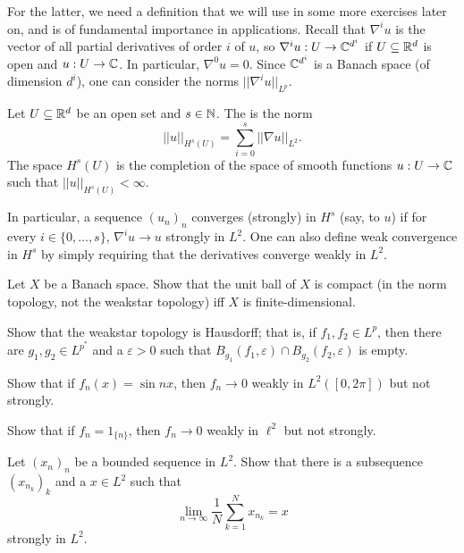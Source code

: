 For the latter, we need a definition that we will use in some more exercises later on, and is of fundamental importance in applications.
Recall that $\nabla^iu$ is the vector of all partial derivatives of order $i$ of $u$, so $\nabla^iu: U \to \mathbb{C}^{d^i}$ if $U \subseteq \mathbb{R}^d$ is open and $u: U \to \mathbb{C}$.
In particular, $\nabla^0u = 0$.
Since $\mathbb{C}^{d^i}$ is a Banach space (of dimension $d^i$), one can consider the norms $||\nabla^iu||_{L^p}$.

\begin{definition}
Let $U \subseteq \mathbb{R}^d$ be an open set and $s \in \mathbb{N}$.
The  is the norm
\[||u||_{H^s(U)} = \sum_{i=0}^{s} ||\nabla u||_{L^2}.\]
The space $H^s(U)$ is the completion of the space of smooth functions $u: U \to \mathbb{C}$ such that $||u||_{H^s(U)} < \infty$.
\end{definition}
In particular, a sequence $(u_{n})_{n}$ converges (strongly) in $H^s$ (say, to $u$) if for every $i \in \{0, \dots, s\}$, $\nabla^iu \to u$ strongly in $L^2$.
One can also define weak convergence in $H^s$ by simply requiring that the derivatives converge weakly in $L^2$.

\begin{exercise}\label{unit ball compactness}
Let $X$ be a Banach space. Show that the unit ball of $X$ is compact (in the norm topology, not the weakstar topology) iff $X$ is finite-dimensional.
\end{exercise}

\begin{exercise}\label{weakstar is hausdorff}
Show that the weakstar topology is Hausdorff; that is, if $f_1, f_2 \in L^p$, then there are $g_1, g_2 \in L^{p^*}$ and a $\varepsilon > 0$ such that $B_{g_1}(f_1, \varepsilon) \cap B_{g_2}(f_2, \varepsilon)$ is empty.
\end{exercise}

\begin{exercise}
Show that if $f_{n}(x) = \sin nx$, then $f_{n} \to 0$ weakly in $L^2([0, 2\pi])$ but not strongly.
\end{exercise}

\begin{exercise}
Show that if $f_{n} = 1_{\{n\}}$, then $f_{n} \to 0$ weakly in $\ell^2$ but not strongly.
\end{exercise}

\begin{exercise}
Let $(x_{n})_{n}$ be a bounded sequence in $L^2$. Show that there is a subsequence $(x_{n_{k}})_{k}$ and a $x \in L^2$ such that
\[\lim_{n \to \infty} \frac{1}{N} \sum_{k=1}^{N} x_{n_{k}} = x\]
strongly in $L^2$.
\end{exercise}

